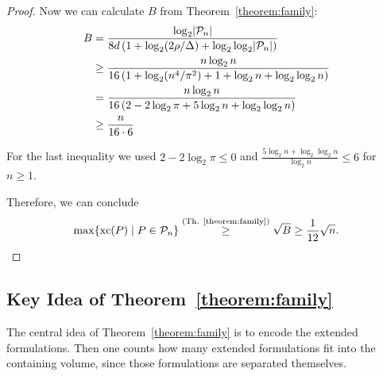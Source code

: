 \begin{proof}
  Now we can calculate $B$ from Theorem~\ref{theorem:family}:
  \begin{align*}
    B & = \frac{\log_2 \lvert\mathcal{P}_n\rvert}{8d \left(1 + \log_2 (2\rho/\Delta) + \log_2\log_2 \lvert\mathcal{P}_n\rvert \right)}   \\
      & \geq \frac{n \log_2 n}{16 \left(1 + \log_2 (n^4 / \pi^2) + 1 + \log_2 n + \log_2 \log_2 n \right)} \\
      & = \frac{n \log_2 n}{16 \left(2 - 2 \log_2 \pi + 5 \log_2 n + \log_2 \log_2 n \right)}              \\
      & \geq \frac{n}{16 \cdot 6}
  \end{align*}

  For the last inequality we used $2 - 2 \log_2 \pi \leq 0$ and $\frac{5 \log_2 n + \log_2 \log_2 n}{\log_2 n} \leq 6$ for $n \geq 1$.

  Therefore, we can conclude $$\max \{\operatorname{xc}(P) \mid P \in \mathcal{P}_n\} \stackrel{\text{(Th. \ref{theorem:family})}}{\geq} \sqrt{B} \geq \frac{1}{12} \sqrt{n} .$$
\end{proof}



\subsection{Key Idea of Theorem~\ref{theorem:family}}

The central idea of Theorem~\ref{theorem:family} is to encode the extended formulations. Then one counts how many extended formulations fit into the containing volume, since those formulations are separated themselves.

